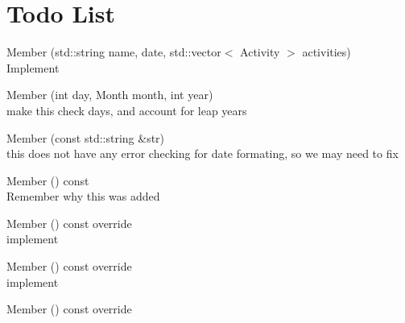 \chapter{Todo List}
\hypertarget{todo}{}\label{todo}

\begin{DoxyRefList}
\item[Member \doxylink{class_w_e_p_1_1_birthday_a1c6bc33385d0df8d53906dad7fae81c4}{WEP\+::Birthday\+::Birthday} (std\+::string name, \doxylink{struct_w_e_p_1_1_date}{Date} date, std\+::vector$<$ Activity $>$ activities)]\hfill \\
\label{todo__todo000001}%
%
Implement  
\item[Member \doxylink{struct_w_e_p_1_1_date_adbd79ca9b499b1db5790f3644dd92bf2}{WEP\+::Date\+::Date} (int day, Month month, int year)]\hfill \\
\label{todo__todo000012}%
%
make this check days, and account for leap years  
\item[Member \doxylink{struct_w_e_p_1_1_date_a49e4eb0bd414b46f6cfabd681f53242b}{WEP\+::Date\+::from\+String} (const std\+::string \&str)]\hfill \\
\label{todo__todo000013}%
%
this does not have any error checking for date formating, so we may need to fix  
\item[Member \doxylink{class_w_e_p_1_1_event_a4b99faa4a41515ac748ec7d92c9eb379}{WEP\+::Event\+::confirm\+Booking} () const]\hfill \\
\label{todo__todo000002}%
%
Remember why this was added  
\item[Member \doxylink{struct_w_e_p_1_1_las_vegas_room_a05fba7720185379c659c92c6745ba11d}{WEP\+::Las\+Vegas\+Room\+::get\+Capacity} () const override]\hfill \\
\label{todo__todo000010}%
%
implement  
\item[Member \doxylink{struct_w_e_p_1_1_las_vegas_room_a6586a21cbd8d1d84e008ed7a05e1273e}{WEP\+::Las\+Vegas\+Room\+::get\+Cost} () const override]\hfill \\
\label{todo__todo000011}%
%
implement  
\item[Member \doxylink{struct_w_e_p_1_1_las_vegas_room_a56e25c53d2467401fc22bf77e0c3c820}{WEP\+::Las\+Vegas\+Room\+::get\+Name} () const override]\hfill \\
\label{todo__todo000009}%

\end{DoxyRefList}
